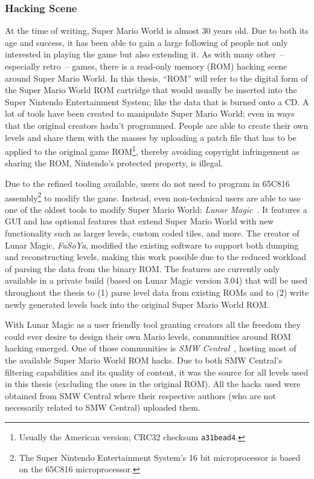 \subsubsection{Hacking Scene}

At the time of writing, Super Mario World is almost 30 years old. Due
to both its age and success, it has been able to gain a large
following of people not only interested in playing the game but also
extending it. As with many other~-- especially retro~-- games, there
is a read-only memory (ROM) hacking scene around Super Mario World. In
this thesis, ``ROM'' will refer to the digital form of the Super Mario
World ROM cartridge that would usually be inserted into the Super
Nintendo Entertainment System; like the data that is burned onto a CD.
A lot of tools have been created to manipulate Super Mario World; even
in ways that the original creators hadn't programmed. People are able
to create their own levels and share them with the masses by uploading
a patch file that has to be applied to the original game ROM\footnote{Usually
the American version; CRC32 checksum \texttt{a31bead4}.}, thereby
avoiding copyright infringement as sharing the ROM, Nintendo's
protected property, is illegal.

Due to the refined tooling available, users do not need to program in
65C816 assembly\footnote{The Super Nintendo Entertainment System's 16
  bit microprocessor is based on the 65C816 microprocessor.} to modify
the game. Instead, even non-technical users are able to use one of the
oldest tools to modify Super Mario World: \emph{Lunar
  Magic}~\cite{FuSoYaNicheLunar}. It features a GUI and has optional
features that extend Super Mario World with new functionality such as
larger levels, custom coded tiles, and more. The creator of Lunar
Magic, \emph{FuSoYa}, modified the existing software to support both
dumping and reconstructing levels, making this work possible due to
the reduced workload of parsing the data from the binary ROM. The
features are currently only available in a private build (based on
Lunar Magic version 3.04) that will be used throughout the thesis to
(1) parse level data from existing ROMs and to (2) write newly
generated levels back into the original Super Mario World ROM.

With Lunar Magic as a user friendly tool granting creators all the
freedom they could ever desire to design their own Mario levels,
communities around ROM hacking emerged. One of those communities is
\emph{SMW Central}~\cite{SMWCentralYour}, hosting most of the
available Super Mario World ROM hacks. Due to both SMW Central's
filtering capabilities and its quality of content, it was the source
for all levels used in this thesis (excluding the ones in the original
ROM). All the hacks used were obtained from SMW Central where their
respective authors (who are not necessarily related to SMW Central)
uploaded them.

